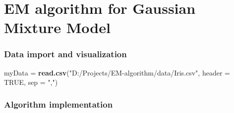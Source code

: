 \documentclass[
]{article}
\author{}
\date{\vspace{-2.5em}}
\newenvironment{Shaded}{\begin{snugshade}}{\end{snugshade}}
\newcommand{\AttributeTok}[1]{\textcolor[rgb]{0.13,0.29,0.53}{#1}}
\newcommand{\ConstantTok}[1]{\textcolor[rgb]{0.56,0.35,0.01}{#1}}
\newcommand{\FunctionTok}[1]{\textcolor[rgb]{0.13,0.29,0.53}{\textbf{#1}}}
\newcommand{\NormalTok}[1]{#1}
\newcommand{\OtherTok}[1]{\textcolor[rgb]{0.56,0.35,0.01}{#1}}
\newcommand{\StringTok}[1]{\textcolor[rgb]{0.31,0.60,0.02}{#1}}
\begin{document}
\section{EM algorithm for Gaussian Mixture
Model}\label{em-algorithm-for-gaussian-mixture-model}

\subsubsection{Data import and
visualization}\label{data-import-and-visualization}

\begin{Shaded}
\begin{Highlighting}[]
\NormalTok{myData }\OtherTok{=} \FunctionTok{read.csv}\NormalTok{(}\StringTok{"D:/Projects/EM{-}algorithm/data/Iris.csv"}\NormalTok{, }\AttributeTok{header =} \ConstantTok{TRUE}\NormalTok{, }\AttributeTok{sep =} \StringTok{","}\NormalTok{) }
\end{Highlighting}
\end{Shaded}

\subsubsection{Algorithm implementation}\label{algorithm-implementation}
\end{document}
